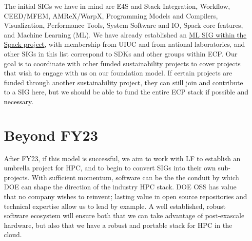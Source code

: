 \documentclass[11pt]{article}
\begin{document}
The initial SIGs we have in mind are E4S and Stack Integration, Workflow, CEED/MFEM,
AMReX/WarpX, Programming Models and Compilers, Visualization, Performance Tools, System
Software and IO, Spack core features, and Machine Learning (ML). We have already
established an \href{https://github.com/spack/spack/wiki/Machine-Learning-SIG}{ML SIG
  within the Spack project}, with membership from UIUC and from national laboratories,
and other SIGs in this list correspond to SDKs and other groups within ECP. Our goal is
to coordinate with other funded sustainability projects to cover projects that wish to
engage with us on our foundation model. If certain projects are funded through another
sustainability project, they can still join and contribute to a SIG here, but we should
be able to fund the entire ECP stack if possible and necessary.

\section{Beyond FY23}

After FY23, if this model is successful, we aim to work with LF to establish an umbrella
project for HPC, and to begin to convert SIGs into their own sub-projects. With
sufficient momentum, software can be the the conduit by which DOE can shape the
direction of the industry HPC stack. DOE OSS has value that no company wishes to
reinvent; lasting value in open source repositories and technical expertise allow us to
lead by example. A well established, robust software ecosystem will ensure both that we
can take advantage of post-exascale hardware, but also that we have a robust and
portable stack for HPC in the cloud.




%
%  


\end{document}
